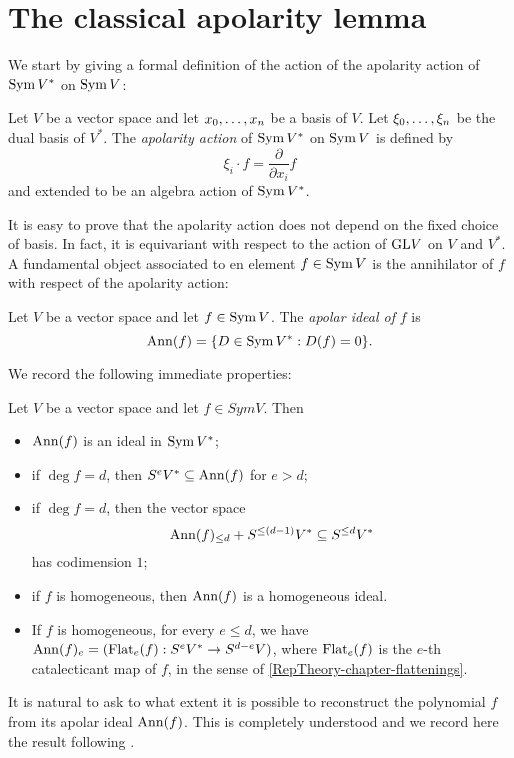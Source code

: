 \section{The classical apolarity lemma}
\label{tensorRank-section-apolarityLemma}
We start by giving a formal definition of the action of the apolarity action of $\operatorname{Sym} V^*$ on $\operatorname{Sym} V$: 
\begin{definition}
\label{tensorRank-definition-apolarityAction}
Let $V$ be a vector space and let $x_0 , \ldots , x_n$ be a basis of $V$. Let $\xi_0 , \ldots , \xi_n$ be the dual basis of $V^*$. The {\it apolarity action} of $\operatorname{Sym} V^*$ on $\operatorname{Sym} V$ is defined by 
\[
\xi_i \cdot f = \frac{\partial}{\partial x_i}f
\]
and extended to be an algebra action of $\operatorname{Sym} V^*$. 
\end{definition}
It is easy to prove that the apolarity action does not depend on the fixed choice of basis. In fact, it is equivariant with respect to the action of $\mathrm{GL} V$ on $V$ and $V^*$. A fundamental object associated to en element $f \in \operatorname{Sym} V$ is the annihilator of $f$ with respect of the apolarity action:
\begin{definition}
\label{tensorRank-definition-apolarIdeal}
Let $V$ be a vector space and let $f \in \operatorname{Sym} V$. The {\it apolar ideal of} $f$ is
\[
\operatorname{Ann}(f) = \{ D \in \operatorname{Sym} V^* : D (f) = 0 \}.
\]
\end{definition}
We record the following immediate properties:
\begin{lemma}
\label{tensorRank-definition-apolarIdealBasics}
Let $V$ be a vector space and let $f \in Sym V$. Then
\begin{itemize}
 \item $\operatorname{Ann}(f)$ is an ideal in $\operatorname{Sym} V^*$;
 \item if $\deg f = d$, then $S^e V^* \subseteq \operatorname{Ann}(f)$ for $e > d$;
 \item if $\deg f = d$, then the vector space
\[
\operatorname{Ann}(f)_{\leq d} + S^{\leq (d-1)}V^* \subseteq S^{\leq d} V^*
\]
has codimension $1$;
\item if $f$ is homogeneous, then $\operatorname{Ann}(f)$ is a homogeneous ideal.
\item If $f$ is homogeneous, for every $e \leq d$, we have $\operatorname{Ann}(f)_e = (\mathrm{Flat}_e(f) : S^e V^* \to S^{d-e} V)$, where $\mathrm{Flat}_e(f)$ is the $e$-th catalecticant map of $f$, in the sense of \ref{RepTheory-chapter-flattenings}.
\end{itemize}
\end{lemma}
It is natural to ask to what extent it is possible to reconstruct the polynomial $f$ from its apolar ideal $\operatorname{Ann}(f)$. This is completely understood and we record here the result following \cite[Lemma 3.33A]{IE78}.

